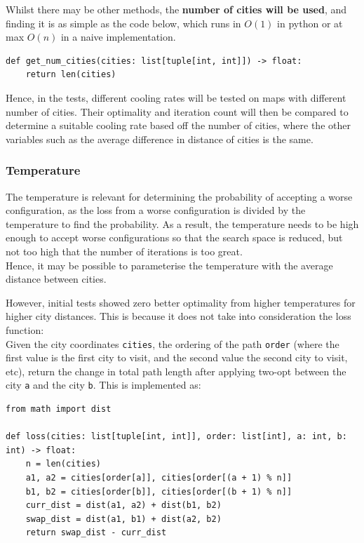 \documentclass{article}
\begin{document}
Whilst there may be other methods, the \textbf{number of cities will be used}, and finding it is as simple as the code below, which runs in $O(1)$ in python or at max $O(n)$ in a naive implementation.

\begin{verbatim}
def get_num_cities(cities: list[tuple[int, int]]) -> float:
    return len(cities)
\end{verbatim}

Hence, in the tests, different cooling rates will be tested on maps with different number of cities.
Their optimality and iteration count will then be compared to determine a suitable cooling rate based off the number of cities, where the other variables such as the average difference in distance of cities is the same.

\subsubsection{Temperature}

The temperature is relevant for determining the probability of accepting a worse configuration, as the loss from a worse configuration is divided by the temperature to find the probability.
As a result, the temperature needs to be high enough to accept worse configurations so that the search space is reduced, but not too high that the number of iterations is too great.
\\

Hence, it may be possible to parameterise the temperature with the average distance between cities.

However, initial tests showed zero better optimality from higher temperatures for higher city distances.
This is because it does not take into consideration the loss function: 
\\
Given the city coordinates \texttt{cities}, the ordering of the path \texttt{order} (where the first value is the first city to visit, and the second value the second city to visit, etc), return the change in total path length after applying two-opt between the city \texttt{a} and the city \texttt{b}.
This is implemented as:

\begin{verbatim}
from math import dist

def loss(cities: list[tuple[int, int]], order: list[int], a: int, b: int) -> float:
    n = len(cities)
    a1, a2 = cities[order[a]], cities[order[(a + 1) % n]]
    b1, b2 = cities[order[b]], cities[order[(b + 1) % n]]
    curr_dist = dist(a1, a2) + dist(b1, b2)
    swap_dist = dist(a1, b1) + dist(a2, b2)
    return swap_dist - curr_dist
\end{verbatim}
\end{document}
